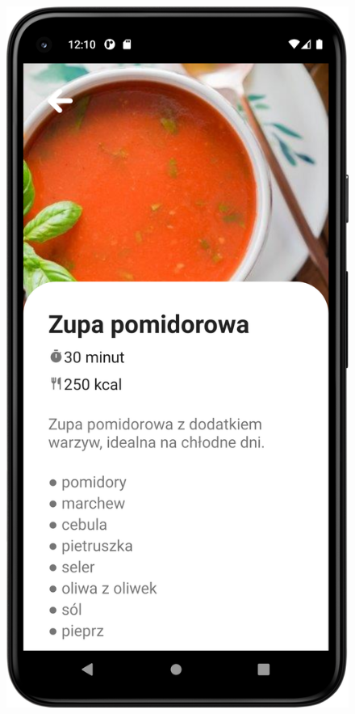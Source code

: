 \documentclass{article}
\begin{document}
\begin{enumerate}
\begin{enumerate}
\begin{figure}[ht]
\begin{minipage}[b]{0.4\textwidth}
    \end{minipage}%
    \begin{minipage}[b]{0.4\textwidth}
        \centering
        \includegraphics[width=\textwidth]{../res/phone_recipe_detail}
    \end{minipage}
\end{figure}




\end{enumerate}
\end{enumerate}
\end{document}
